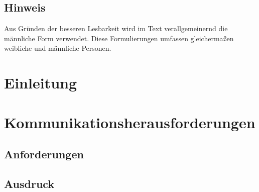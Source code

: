 \documentclass[
	12pt, %
	a4paper,
	bibliography=totoc, %
	numbers=noenddot, %
	ngerman, %
	headsepline, %
	oneside %
	]{scrbook} %
\newenvironment*{dontcount}{}{}
\begin{document}

\newpage

\tableofcontents{}

\listoffigures
{}

\begin{dontcount}
\section*{Hinweis}

Aus Gründen der besseren Lesbarkeit wird im Text verallgemeinernd die männliche Form verwendet.
Diese Formulierungen umfassen gleichermaßen weibliche und männliche Personen.

\clearpage
\end{dontcount}



\printnoidxglossary{}
\printacronyms{}



\chapter{Einleitung}\label{ch:einleitung}


\chapter{Kommunikationsherausforderungen}\label{ch:theroy}


\section{Anforderungen}\label{subsec:anforderungen}



\section{Ausdruck}\label{subsec:umgebung}

\end{document}
